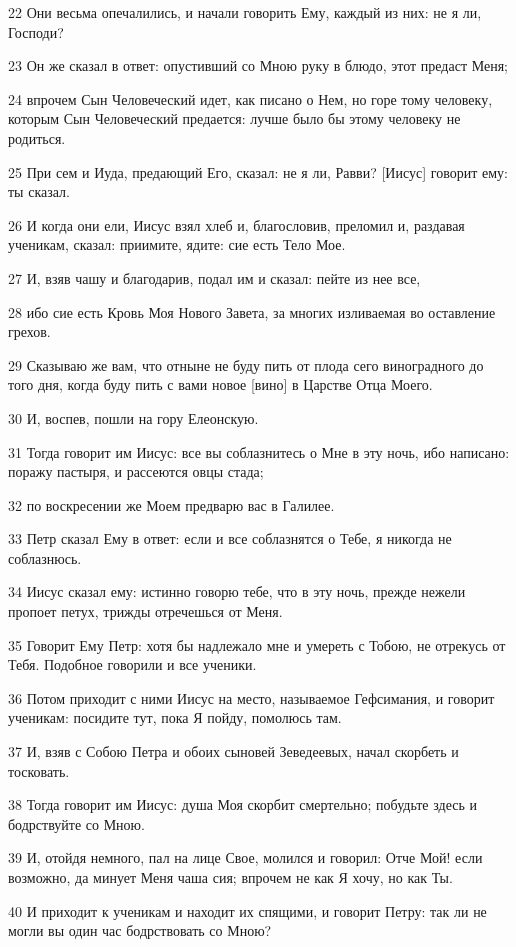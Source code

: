 \par 22 Они весьма опечалились, и начали говорить Ему, каждый из них: не я ли, Господи?
\par 23 Он же сказал в ответ: опустивший со Мною руку в блюдо, этот предаст Меня;
\par 24 впрочем Сын Человеческий идет, как писано о Нем, но горе тому человеку, которым Сын Человеческий предается: лучше было бы этому человеку не родиться.
\par 25 При сем и Иуда, предающий Его, сказал: не я ли, Равви? [Иисус] говорит ему: ты сказал.
\par 26 И когда они ели, Иисус взял хлеб и, благословив, преломил и, раздавая ученикам, сказал: приимите, ядите: сие есть Тело Мое.
\par 27 И, взяв чашу и благодарив, подал им и сказал: пейте из нее все,
\par 28 ибо сие есть Кровь Моя Нового Завета, за многих изливаемая во оставление грехов.
\par 29 Сказываю же вам, что отныне не буду пить от плода сего виноградного до того дня, когда буду пить с вами новое [вино] в Царстве Отца Моего.
\par 30 И, воспев, пошли на гору Елеонскую.
\par 31 Тогда говорит им Иисус: все вы соблазнитесь о Мне в эту ночь, ибо написано: поражу пастыря, и рассеются овцы стада;
\par 32 по воскресении же Моем предварю вас в Галилее.
\par 33 Петр сказал Ему в ответ: если и все соблазнятся о Тебе, я никогда не соблазнюсь.
\par 34 Иисус сказал ему: истинно говорю тебе, что в эту ночь, прежде нежели пропоет петух, трижды отречешься от Меня.
\par 35 Говорит Ему Петр: хотя бы надлежало мне и умереть с Тобою, не отрекусь от Тебя. Подобное говорили и все ученики.
\par 36 Потом приходит с ними Иисус на место, называемое Гефсимания, и говорит ученикам: посидите тут, пока Я пойду, помолюсь там.
\par 37 И, взяв с Собою Петра и обоих сыновей Зеведеевых, начал скорбеть и тосковать.
\par 38 Тогда говорит им Иисус: душа Моя скорбит смертельно; побудьте здесь и бодрствуйте со Мною.
\par 39 И, отойдя немного, пал на лице Свое, молился и говорил: Отче Мой! если возможно, да минует Меня чаша сия; впрочем не как Я хочу, но как Ты.
\par 40 И приходит к ученикам и находит их спящими, и говорит Петру: так ли не могли вы один час бодрствовать со Мною?
